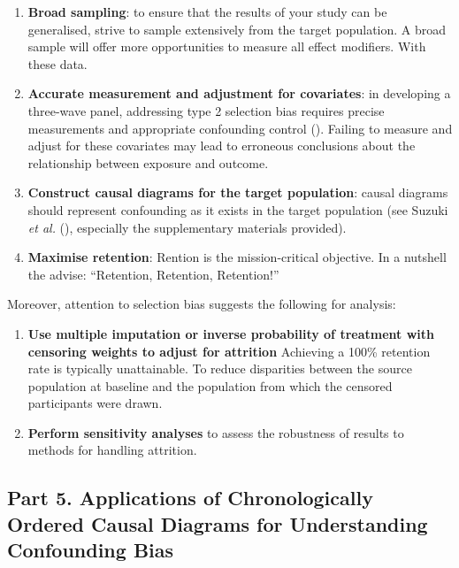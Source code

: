 \documentclass[
  singlecolumn]{article}
\begin{document}
\begin{enumerate}
\def\labelenumi{\arabic{enumi}.}
\item
  \textbf{Broad sampling}: to ensure that the results of your study can
  be generalised, strive to sample extensively from the target
  population. A broad sample will offer more opportunities to measure
  all effect modifiers. With these data.
\item
  \textbf{Accurate measurement and adjustment for covariates}: in
  developing a three-wave panel, addressing type 2 selection bias
  requires precise measurements and appropriate confounding control
  (). Failing to measure and
  adjust for these covariates may lead to erroneous conclusions about
  the relationship between exposure and outcome.
\item
  \textbf{Construct causal diagrams for the target population}: causal
  diagrams should represent confounding as it exists in the target
  population (see Suzuki \emph{et al.}
  (), especially the supplementary
  materials provided).
\item
  \textbf{Maximise retention}: Rention is the mission-critical
  objective. In a nutshell the advise: ``Retention, Retention,
  Retention!''
\end{enumerate}

Moreover, attention to selection bias suggests the following for
analysis:

\begin{enumerate}
\def\labelenumi{\arabic{enumi}.}
\setcounter{enumi}{4}
\item
  \textbf{Use multiple imputation or inverse probability of treatment
  with censoring weights to adjust for attrition} Achieving a 100\%
  retention rate is typically unattainable. To reduce disparities
  between the source population at baseline and the population from
  which the censored participants were drawn.
\item
  \textbf{Perform sensitivity analyses} to assess the robustness of
  results to methods for handling attrition.
\end{enumerate}

\subsection{Part 5. Applications of Chronologically Ordered Causal
Diagrams for Understanding Confounding
Bias}\label{part-5.-applications-of-chronologically-ordered-causal-diagrams-for-understanding-confounding-bias}
\end{document}
